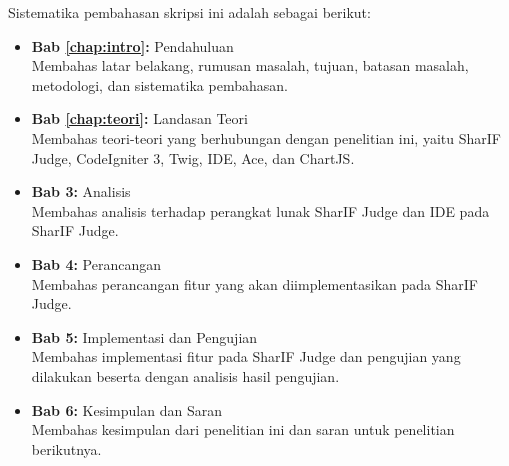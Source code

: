 Sistematika pembahasan skripsi ini adalah sebagai berikut:
\begin{itemize}
    \item \textbf{Bab \ref{chap:intro}:} Pendahuluan \\
          Membahas latar belakang, rumusan masalah, tujuan, batasan masalah, metodologi, dan sistematika pembahasan.
    \item \textbf{Bab \ref{chap:teori}:} Landasan Teori \\
          Membahas teori-teori yang berhubungan dengan penelitian ini, yaitu SharIF Judge, CodeIgniter 3, Twig, IDE, Ace, dan ChartJS.
    \item \textbf{Bab 3:} Analisis \\
          Membahas analisis terhadap perangkat lunak SharIF Judge dan IDE pada SharIF Judge.
    \item \textbf{Bab 4:} Perancangan \\
          Membahas perancangan fitur yang akan diimplementasikan pada SharIF Judge.
    \item \textbf{Bab 5:} Implementasi dan Pengujian \\
          Membahas implementasi fitur pada SharIF Judge dan pengujian yang dilakukan beserta dengan analisis hasil pengujian.
    \item \textbf{Bab 6:} Kesimpulan dan Saran \\
          Membahas kesimpulan dari penelitian ini dan saran untuk penelitian berikutnya.
\end{itemize}